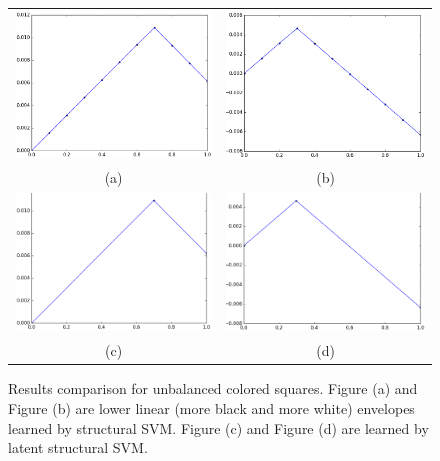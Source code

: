\begin{figure}[ht]
  \centering
  \setlength{\tabcolsep}{2pt}
  \begin{tabular}{cc}
    \includegraphics[width=0.5\columnwidth]{Part2/figures/unba_black_res_old.png}&
                                                                              \includegraphics[width=0.5\columnwidth]{Part2/figures/unba_white_res_old.png}\\
    {\small (a)} & {\small (b)} \\
    \includegraphics[width=0.5\columnwidth]{Part2/figures/unba_black_res_new.png}&
                                                                              \includegraphics[width=0.5\columnwidth]{Part2/figures/unba_white_res_new.png}\\
    {\small (c)} & {\small (d)} 
  \end{tabular}
  \caption{\label{fig:unba_results} Results comparison for
    unbalanced colored squares. Figure (a) and Figure (b) are
    lower linear (more black and more white) envelopes learned by
    structural SVM. Figure (c) and Figure (d) are learned by
    latent structural SVM.}
\end{figure}

